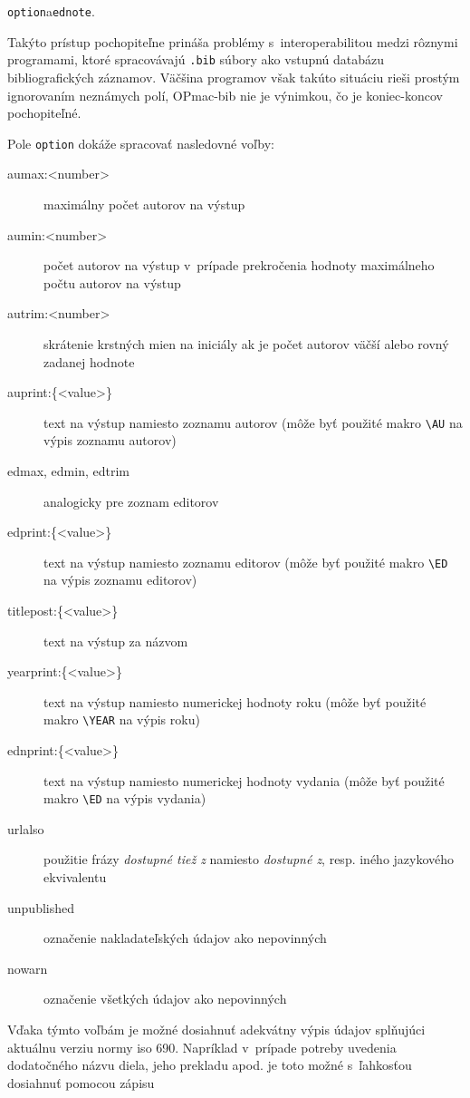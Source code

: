 \documentclass[
  color,
  table,
  nolof,
  oneside,
]{fithesis3}
\begin{document}
\begin{center}
\texttt{option}\enspace a\enspace \texttt{ednote}.
\end{center}

\noindent Takýto prístup pochopiteľne prináša problémy s~interoperabilitou medzi rôznymi programami, ktoré spracovávajú \texttt{.bib} súbory ako vstupnú databázu bibliografických záznamov. Väčšina programov však takúto situáciu rieši prostým ignorovaním neznámych polí, OPmac-bib nie je výnimkou, čo je koniec-koncov pochopiteľné.

Pole \texttt{option} dokáže spracovať nasledovné voľby:

\begin{description}
  \item[aumax:<number>] maximálny počet autorov na výstup
  \item[aumin:<number>] počet autorov na výstup v~prípade prekročenia hodnoty maximálneho počtu autorov na výstup
  \item[autrim:<number>] skrátenie krstných mien na iniciály ak je počet autorov väčší alebo rovný zadanej hodnote
  \item[auprint:\{<value>\}] text na výstup namiesto zoznamu autorov (môže byť použité makro \verb|\AU| na výpis zoznamu autorov)
  \item[edmax, edmin, edtrim] analogicky pre zoznam editorov
  \item[edprint:\{<value>\}] text na výstup namiesto zoznamu editorov (môže byť použité makro \verb|\ED| na výpis zoznamu editorov)
  \item[titlepost:\{<value>\}] text na výstup za názvom
  \item[yearprint:\{<value>\}] text na výstup namiesto numerickej hodnoty roku (môže byť použité makro \verb|\YEAR| na výpis roku)
  \item[ednprint:\{<value>\}] text na výstup namiesto numerickej hodnoty vydania (môže byť použité makro \verb|\ED| na výpis vydania)
  \item[urlalso] použitie frázy \textit{dostupné tiež z} namiesto \textit{dostupné z}, resp. iného jazykového ekvivalentu
  \item[unpublished] označenie nakladateľských údajov ako nepovinných
  \item[nowarn] označenie všetkých údajov ako nepovinných
\end{description}

Vďaka týmto voľbám je možné dosiahnuť adekvátny výpis údajov splňujúci aktuálnu verziu normy \gls{iso} 690. Napríklad v~prípade potreby uvedenia dodatočného názvu diela, jeho prekladu apod. je toto možné s~ľahkosťou dosiahnuť pomocou zápisu
\end{document}
